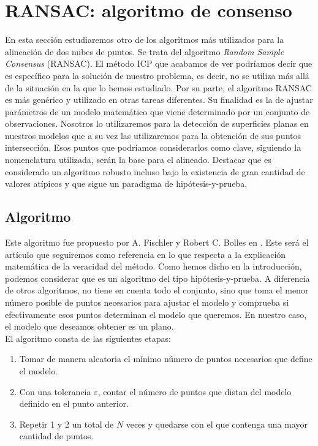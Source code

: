 \chapter{RANSAC: algoritmo de consenso}
En esta sección estudiaremos otro de los algoritmos más utilizados para la alineación de dos nubes de puntos. Se trata del algoritmo \textit{Random Sample Consensus} (RANSAC). El método ICP que acabamos de ver podríamos decir que es específico para la solución de nuestro problema, es decir, no se utiliza más allá de la situación en la que lo hemos estudiado. Por su parte, el algoritmo RANSAC es más genérico y utilizado en otras tareas diferentes. Su finalidad es la de ajustar parámetros de un modelo matemático que viene determinado por un conjunto de observaciones. Nosotros lo utilizaremos para la detección de superficies planas en nuestros modelos que a su vez las utilizaremos para la obtención de sus puntos intersección. Esos puntos que podríamos considerarlos como clave, siguiendo la nomenclatura utilizada, serán la base para el alineado. Destacar que es considerado un algoritmo robusto incluso bajo la existencia de gran cantidad de valores atípicos y que sigue un paradigma de hipótesis-y-prueba.

\section{Algoritmo}
Este algoritmo fue propuesto por A. Fischler y Robert C. Bolles en \cite{fischler1981random}. Este será el artículo que seguiremos como referencia en lo que respecta a la explicación matemática de la veracidad del método. Como hemos dicho en la introducción, podemos considerar que es un algoritmo del tipo hipótesis-y-prueba. A diferencia de otros algoritmos, no tiene en cuenta todo el conjunto, sino que toma el menor número posible de puntos necesarios para ajustar el modelo y comprueba si efectivamente esos puntos determinan el modelo que queremos. En nuestro caso, el modelo que deseamos obtener es un plano.\\

El algoritmo consta de las siguientes etapas:
\begin{enumerate}
\item Tomar de manera aleatoria el mínimo número de puntos necesarios que define el modelo.
\item Con una tolerancia $ \varepsilon$, contar el número de puntos que distan del modelo definido en el punto anterior.
\item Repetir 1 y 2 un total de $ N $ veces y quedarse con el que contenga una mayor cantidad de puntos.
\end{enumerate}

